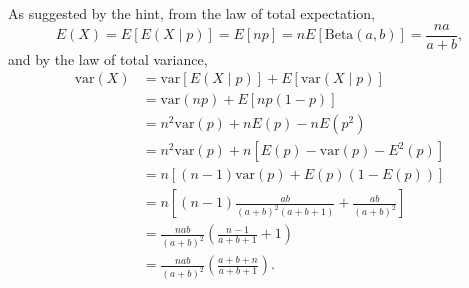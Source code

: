 \begin{parts}
  \begin{solution}
    As suggested by the hint, from the law of total expectation,
    \[
      E(X) = E[E(X \mid  p)] = E[np] = n E[\mathrm{Beta}(a, b)] = \frac{na}{a+b},
    \]
    and by the law of total variance,
    \begin{align*}
      \mathrm{var}(X) & = \mathrm{var}[E(X \mid p)] + E[\mathrm{var}(X \mid  p)]                \\
                      & = \mathrm{var}(np) + E[np(1-p)]                                         \\
                      & = n^2 \mathrm{var}(p) +  n E(p) - nE(p^2)                               \\
                      & = n^2 \mathrm{var}(p) +  n [E(p) - \mathrm{var}(p) - E^2(p)]            \\
                      & = n [(n-1) \mathrm{var}(p) + E(p)(1 - E(p))]                            \\
                      & = n \left[ (n-1) \frac{ab}{(a+b)^2(a+b+1)} + \frac{ab}{(a+b)^2} \right] \\
                      & = \frac{nab}{(a+b)^2} \left( \frac{n-1}{a+b+1} + 1 \right)              \\
                      & = \frac{nab}{(a+b)^2} \left( \frac{a+b+n}{a+b+1} \right).
    \end{align*}
  \end{solution}
\end{parts}